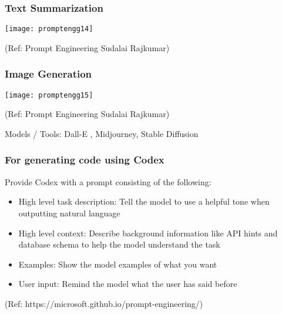 \begin{frame}[fragile]\frametitle{Text Summarization}

\begin{center}
\texttt{[image: promptengg14]}

{\tiny (Ref: Prompt Engineering Sudalai Rajkumar)}

\end{center}		
		


\end{frame}

\begin{frame}[fragile]\frametitle{Image Generation}

\begin{center}
\texttt{[image: promptengg15]}

{\tiny (Ref: Prompt Engineering Sudalai Rajkumar)}

\end{center}		
		
		
Models / Tools: Dall-E , Midjourney, Stable Diffusion



\end{frame}


\begin{frame}[fragile]\frametitle{For generating code using Codex}

Provide Codex with a prompt consisting of the following:



\begin{itemize}
\item  High level task description: Tell the model to use a helpful tone when outputting natural language
\item  High level context: Describe background information like API hints and database schema to help the model understand the task
\item  Examples: Show the model examples of what you want
\item  User input: Remind the model what the user has said before
\end{itemize}	 

{\tiny (Ref: https://microsoft.github.io/prompt-engineering/)}

\end{frame}

